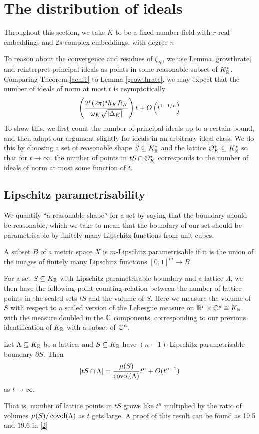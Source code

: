\documentclass[11pt]{report}
\begin{document}
\section{The distribution of ideals}
Throughout this section, we take $K$ to be a fixed number field with $r$ real embeddings and $2s$ complex embeddings, with degree $n$

To reason about the convergence and residues of $\zeta_K$, we use Lemma \ref{growthrate} and reinterpret principal ideals as points in some reasonable subset of $K_{\mathbb{R}}^*$. Comparing Theorem \ref{acnf1} to Lemma \ref{growthrate}, we may expect that the number of ideals of norm at most $t$ is asymptotically
$$
    \left(  \frac{2^r(2\pi)^sh_KR_K}{\omega_K\sqrt{\left| \Delta_K \right|}}  \right)t + O\left(  t^{1 - 1/n}  \right)
$$
To show this, we first count the number of principal ideals up to a certain bound, and then adapt our argument slightly for ideals in an arbitrary ideal class. We do this by choosing a set of reasonable shape $S \subseteq K_{\mathbb{R}}^*$ and the lattice $\mathcal{O}_K^* \subseteq K_{\mathbb{R}}^*$ so that for $t \to \infty$, the number of points in $tS \cap \mathcal{O}_K^*$ corresponds to the number of ideals of norm at most some function of $t$.
\subsection{Lipschitz parametrisability}
We quantify ``a reasonable shape'' for a set by saying that the boundary should be reasonable, which we take to mean that the boundary of our set should be parametrisable by finitely many Lipschitz functions from unit cubes.
\begin{definition}
    A subset $B$ of a metric space $X$ is $m$-Lipschitz parametrisable if it is the union of the images of finitely many Lipschitz functions $[0, 1]^m \to B$
\end{definition}
For a set $S \subseteq K_{\mathbb{R}}$ with Lipschitz parametrisable boundary and a lattice $\Lambda$, we then have the following point-counting relation between the number of lattice points in the scaled sets $tS$ and the volume of $S$. Here we measure the volume of $S$ with respect to a scaled version of the Lebesgue measure on $\mathbb{R}^r \times \mathbb{C}^s \cong K_{\mathbb{R}}$, with the measure doubled in the $\mathbb{C}$ components, corresponding to our previous identification of $K_{\mathbb{R}}$ with a subset of $\mathbb{C}^n$.
\begin{lemma}\label{ptcount}
    Let $\Lambda \subseteq K_{\mathbb{R}}$ be a lattice, and $S \subseteq K_{\mathbb{R}}$ have $(n - 1)$-Lipschitz parametrisable boundary $\partial S$. Then 
    $$
        \left| tS \cap \Lambda \right| = \frac{\mu(S)}{\operatorname{covol}(\Lambda)}t^n + O(t^{n - 1})
    $$
    as $t \to \infty$.
\end{lemma}
That is, number of lattice points in $tS$ grows like $t^n$ multiplied by the ratio of volumes $\mu(S)/\operatorname{covol}(\Lambda)$ as $t$ gets large. A proof of this result can be found as 19.5 and 19.6 in \hyperlink{sutherland}{[2]}
\end{document}
